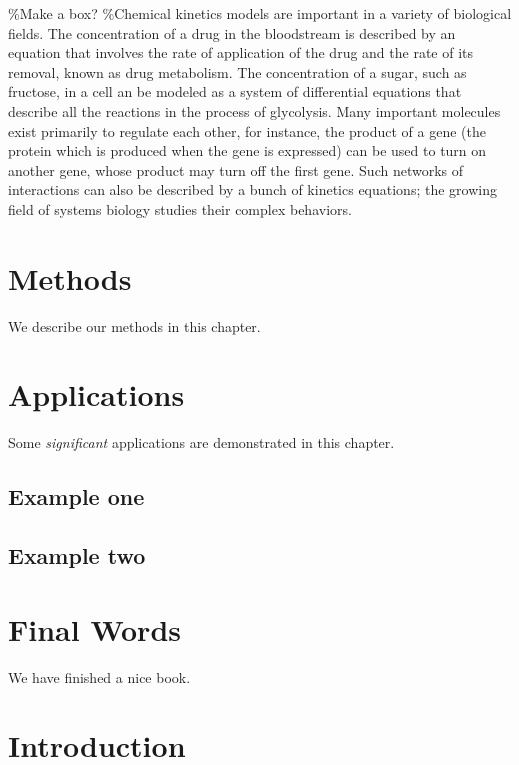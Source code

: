 \documentclass[
]{book}
\begin{document}
\%Make a box?
\%Chemical kinetics models are important in a variety of biological fields. The concentration of a drug in the bloodstream is described by an equation that involves the rate of application of the drug and the rate of its removal, known as drug metabolism. The concentration of a sugar, such as fructose, in a cell an be modeled as a system of differential equations that describe all the reactions in the process of glycolysis. Many important molecules exist primarily to regulate each other, for instance, the product of a gene (the protein which is produced when the gene is expressed) can be used to turn on another gene, whose product may turn off the first gene. Such networks of interactions can also be described by a bunch of kinetics equations; the growing field of systems biology studies their complex behaviors.

\hypertarget{methods}{%
\chapter{Methods}\label{methods}}

We describe our methods in this chapter.

\hypertarget{applications}{%
\chapter{Applications}\label{applications}}

Some \emph{significant} applications are demonstrated in this chapter.

\hypertarget{example-one}{%
\section{Example one}\label{example-one}}

\hypertarget{example-two}{%
\section{Example two}\label{example-two}}

\hypertarget{final-words}{%
\chapter{Final Words}\label{final-words}}

We have finished a nice book.

\hypertarget{intro}{%
\chapter{Introduction}\label{intro}}
\end{document}

